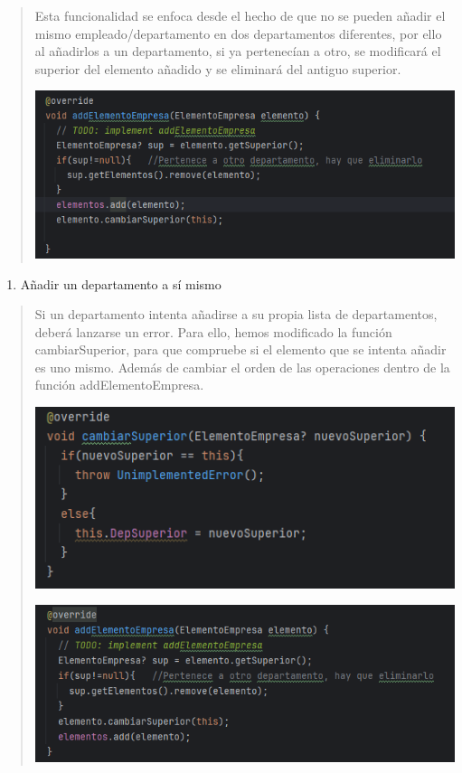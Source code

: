 \documentclass[openany]{article}
\begin{document}
\begin{quote}
Esta funcionalidad se enfoca desde el hecho de que no se pueden añadir
el mismo empleado/departamento en dos departamentos diferentes, por ello
al añadirlos a un departamento, si ya pertenecían a otro, se modificará
el superior del elemento añadido y se eliminará del antiguo superior.

\includegraphics{imagenes/test4.png}
\end{quote}

\begin{enumerate}
\def\labelenumi{\arabic{enumi}.}
\setcounter{enumi}{3}
\item
  Añadir un departamento a sí mismo
\end{enumerate}

\begin{quote}
Si un departamento intenta añadirse a su propia lista de departamentos,
deberá lanzarse un error. Para ello, hemos modificado la función
cambiarSuperior, para que compruebe si el elemento que se intenta añadir
es uno mismo. Además de cambiar el orden de las operaciones dentro de la
función addElementoEmpresa.

\includegraphics{imagenes/test_extra.png}

\includegraphics{imagenes/test_extra2.png}
\end{quote}
\end{document}
